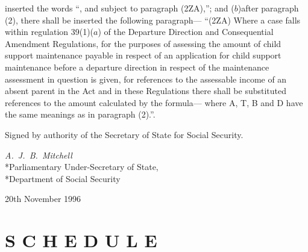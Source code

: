 \documentclass[a4paper]{article}
\newcommand{\parthead}{}
\begin{document}
inserted the words “, and subject to paragraph (2ZA),”; and
($b$)after paragraph (2), there shall be inserted the following paragraph—
“(2ZA) Where a case falls within regulation 39(1)($a$) of the Departure Direction
and Consequential Amendment Regulations, for the purposes of assessing the
amount of child support maintenance payable in respect of an application for
child support maintenance before a departure direction in respect of the
maintenance assessment in question is given, for references to the assessable
income of an absent parent in the Act and in these Regulations there shall be
substituted references to the amount calculated by the formula—
where A, T, B and D have the same meanings as in paragraph (2).”.

\bigskip

Signed by authority of the Secretary of State for Social Security.

{\raggedleft
\emph{A.\ J.\ B.\ Mitchell}\\*Parliamentary Under-Secretary of
State,\\*Department of Social Security

}

20th November 1996

\clearpage

\part[Schedule]{S C H E D U L E}

\renewcommand\parthead{--- Schedule}
\end{document}
